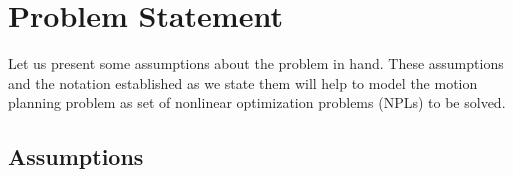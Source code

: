 
\chapter{Problem Statement}
\let\cleardoublepage\savecleardoublepage

Let us present some assumptions about the problem in hand. These assumptions and the notation established as we state them will help to model the motion planning problem as set of nonlinear optimization problems (NPLs) to be solved.

\section{Assumptions}


